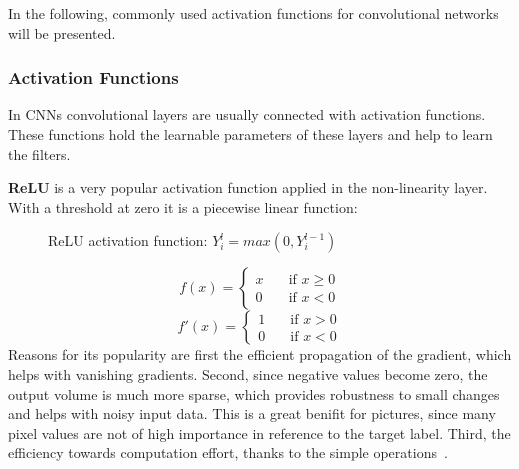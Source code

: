 In the following, commonly used activation functions for convolutional networks will be presented.

\subsubsection{Activation Functions}
\label{activations}
In \glspl{CNN} convolutional layers are usually connected with activation functions.
These functions hold the learnable parameters of these layers and help to learn the filters.

\textbf{\gls{ReLU}} is a very popular activation function applied in the non-linearity layer.
With a threshold at zero it is a piecewise linear function:

\begin{figure}
\centering
\caption{\gls{ReLU} activation function: $Y_i^l=max(0,Y_i^{l-1})$} \label{fig:ReLU}

\end{figure}
\[ f(x) =
  \begin{cases}
    x       & \quad \text{if } x \geq 0\\
    0  & \quad \text{if } x < 0
  \end{cases}
\]
\[ f'(x) =
  \begin{cases}
    1       & \quad \text{if } x > 0\\
    0  & \quad \text{if } x < 0
  \end{cases}
\]
Reasons for its popularity are first the efficient propagation of the gradient, which helps with vanishing gradients.
Second, since negative values become zero, the output volume is much more sparse, which provides robustness to
small changes and helps with noisy input data.
This is a great benifit for pictures, since many pixel values are not of high importance in reference to
the target label.
Third, the efficiency towards computation effort, thanks to the simple operations~\cite{wikitumcnn, advanceddeeplearningpython}.

